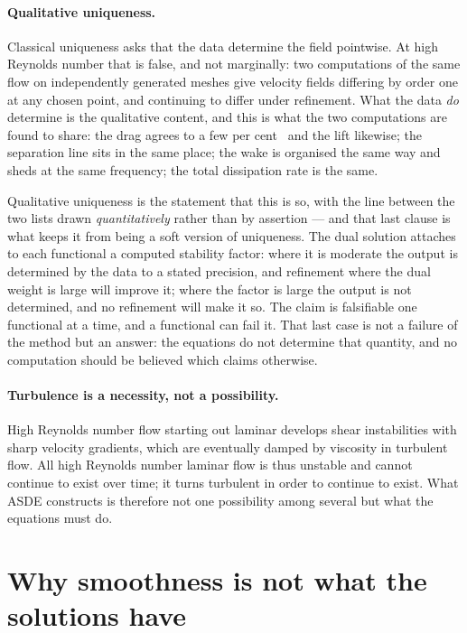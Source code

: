 \documentclass[11pt]{article}
\begin{document}
\paragraph{Qualitative uniqueness.} Classical uniqueness asks that the data determine the field
pointwise. At high Reynolds number that is false, and not marginally: two computations of the same
flow on independently generated meshes give velocity fields differing by order one at any chosen
point, and continuing to differ under refinement. What the data \emph{do} determine is the
qualitative content, and this is what the two computations are found to share: the drag agrees to a
few per cent~\cite{drag} and the lift likewise; the separation line sits in the same place; the wake
is organised the same way and sheds at the same frequency; the total dissipation rate is the same.

Qualitative uniqueness is the statement that this is so, with the line between the two lists drawn
\emph{quantitatively} rather than by assertion --- and that last clause is what keeps it from being
a soft version of uniqueness. The dual solution attaches to each functional a computed stability
factor: where it is moderate the output is determined by the data to a stated precision, and
refinement where the dual weight is large will improve it; where the factor is large the output is
not determined, and no refinement will make it so. The claim is falsifiable one functional at a
time, and a functional can fail it. That last case is not a failure of the method but an answer:
the equations do not determine that quantity, and no computation should be believed which claims
otherwise.

\paragraph{Turbulence is a necessity, not a possibility.} High Reynolds number flow starting out
laminar develops shear instabilities with sharp velocity gradients, which are eventually damped by
viscosity in turbulent flow. All high Reynolds number laminar flow is thus unstable and cannot
continue to exist over time; it turns turbulent in order to continue to exist. What ASDE constructs
is therefore not one possibility among several but what the equations must do.


\section{Why smoothness is not what the solutions have}\label{sec:third}
\end{document}
